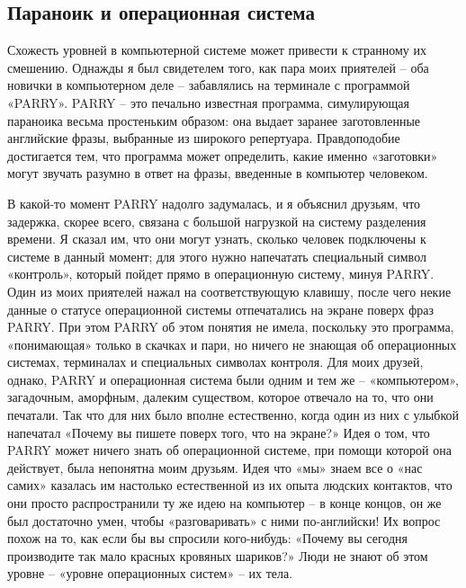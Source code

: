 \documentclass[../main.tex]{subfiles}
\begin{document}
\subsection{Параноик и операционная система}

Схожесть уровней в компьютерной системе может привести к странному их смешению. Однажды я был свидетелем того, как пара моих приятелей \--- оба новички в компьютерном деле \--- забавлялись на терминале с программой «PARRY». PARRY \--- это печально известная программа, симулирующая параноика весьма простеньким образом: она выдает заранее заготовленные английские фразы, выбранные из широкого репертуара. Правдоподобие достигается тем, что программа может определить, какие именно «заготовки» могут звучать разумно в ответ на фразы, введенные в компьютер человеком.

В какой-то момент PARRY надолго задумалась, и я объяснил друзьям, что задержка, скорее всего, связана с большой нагрузкой на систему разделения времени. Я сказал им, что они могут узнать, сколько человек подключены к системе в данный момент; для этого нужно напечатать специальный символ «контроль», который пойдет прямо в операционную систему, минуя PARRY\@. Один из моих приятелей нажал на соответствующую клавишу, после чего некие данные о статусе операционной системы отпечатались на экране поверх фраз PARRY\@. При этом PARRY об этом понятия не имела, поскольку это программа, «понимающая» только в скачках и пари, но ничего не знающая об операционных системах, терминалах и специальных символах контроля. Для моих друзей, однако, PARRY и операционная система были одним и тем же \--- «компьютером», загадочным, аморфным, далеким существом, которое отвечало на то, что они печатали. Так что для них было вполне естественно, когда один из них с улыбкой напечатал «Почему вы пишете поверх того, что на экране?» Идея о том, что PARRY может ничего знать об операционной системе, при помощи которой она действует, была непонятна моим друзьям. Идея что «мы» знаем все о «нас самих» казалась им настолько естественной из их опыта людских контактов, что они просто распространили ту же идею на компьютер \--- в конце концов, он же был достаточно умен, чтобы «разговаривать» с ними по-английски! Их вопрос похож на то, как если бы вы спросили кого-нибудь: «Почему вы сегодня производите так мало красных кровяных шариков?» Люди не знают об этом уровне \--- «уровне операционных систем» \--- их тела.
\end{document}
